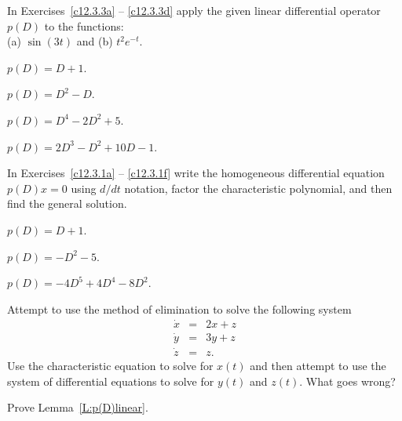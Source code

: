 \documentclass{ximera}
\begin{document}
\EXER

\TEXER

\noindent In Exercises~\ref{c12.3.3a} -- \ref{c12.3.3d} apply the given
linear differential operator $p(D)$ to the functions: \\
(a) $\sin(3t)$ and  (b) $t^2 e^{-t}$.
\begin{exercise} \label{c12.3.3a}
$p(D) = D+1$.
\end{exercise}
\begin{exercise} \label{c12.3.3b}
$p(D) = D^2-D$.
\end{exercise}
\begin{exercise} \label{c12.3.3c}
$p(D) = D^4-2D^2+5$.
\end{exercise}
\begin{exercise} \label{c12.3.3d}
$p(D) = 2D^3-D^2+10D-1$.
\end{exercise}


\noindent In Exercises~\ref{c12.3.1a} -- \ref{c12.3.1f} write the 
homogeneous differential equation $p(D)x=0$ using $d/dt$ notation,
factor the characteristic polynomial, and then find the general solution.
\begin{exercise}  \label{c12.3.1a}
$p(D) = D + 1$.
\end{exercise}
\begin{exercise}  \label{c12.3.1b}
$p(D) = -D^2 - 5$.
\end{exercise}

\begin{exercise}  \label{c12.3.1f}
$p(D) = -4D^5 +4D^4 -8D^2$.
\end{exercise}

\begin{exercise}  \label{c12.3.2}
Attempt to use the method of elimination to solve the following system
\[
\begin{array}{rcl}
\dot{x} & = & 2x + z\\
\dot{y} & = & 3y + z\\
\dot{z} & = & z.
\end{array}
\]
Use the characteristic equation  to solve for $x(t)$ and 
then attempt to use the system of differential equations to solve for $y(t)$ 
and $z(t)$.  What goes wrong?
\end{exercise} 

\begin{exercise}  \label{c12.3.lem}
Prove Lemma~\ref{L:p(D)linear}.
\end{exercise}
\end{document}
